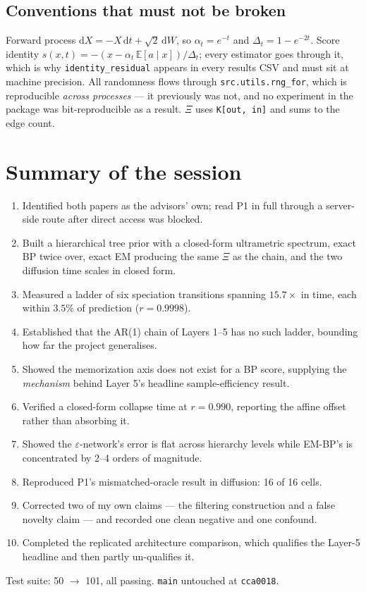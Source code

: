 \documentclass[11pt]{article}
\theoremstyle{remark}
\newcommand{\E}{\mathbb{E}}
\newcommand{\Xis}{\Xi}
\newcommand{\code}[1]{\texttt{\small #1}}
\begin{document}
\subsection{Conventions that must not be broken}

Forward process $\mathrm dX = -X\,\mathrm dt + \sqrt2\,\mathrm dW$, so
$\alpha_t = e^{-t}$ and $\Delta_t = 1-e^{-2t}$. Score identity
$s(x,t) = -(x-\alpha_t\,\E[a\mid x])/\Delta_t$; every estimator goes through it,
which is why \code{identity\_residual} appears in every results CSV and must sit
at machine precision. All randomness flows through \code{src.utils.rng\_for},
which is reproducible \emph{across processes} --- it previously was not, and no
experiment in the package was bit-reproducible as a result. $\Xis$ uses
\code{K[out, in]} and sums to the edge count.

\section*{Summary of the session}

\begin{enumerate}[nosep]
  \item Identified both papers as the advisors' own; read P1 in full through a
    server-side route after direct access was blocked.
  \item Built a hierarchical tree prior with a closed-form ultrametric spectrum,
    exact BP twice over, exact EM producing the same $\Xis$ as the chain, and
    the two diffusion time scales in closed form.
  \item Measured a ladder of six speciation transitions spanning $15.7\times$ in
    time, each within $3.5\%$ of prediction ($r = 0.9998$).
  \item Established that the AR(1) chain of Layers 1--5 has no such ladder,
    bounding how far the project generalises.
  \item Showed the memorization axis does not exist for a BP score, supplying
    the \emph{mechanism} behind Layer 5's headline sample-efficiency result.
  \item Verified a closed-form collapse time at $r = 0.990$, reporting the
    affine offset rather than absorbing it.
  \item Showed the $\varepsilon$-network's error is flat across hierarchy levels
    while EM-BP's is concentrated by 2--4 orders of magnitude.
  \item Reproduced P1's mismatched-oracle result in diffusion: 16 of 16 cells.
  \item Corrected two of my own claims --- the filtering construction and a false
    novelty claim --- and recorded one clean negative and one confound.
  \item Completed the replicated architecture comparison, which qualifies the
    Layer-5 headline and then partly un-qualifies it.
\end{enumerate}

Test suite: 50 $\to$ 101, all passing. \code{main} untouched at \code{cca0018}.
\end{document}
